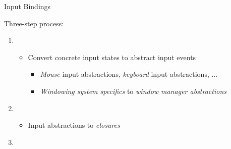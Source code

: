 \begin{frame}[t]{Input Bindings}

    Three-step process:

    \begin{enumerate}
        \itemsep.3em

        \item {}
            \begin{itemize}
                \item Convert concrete input states to abstract input events
                    \begin{itemize}
                        \item \textit{Mouse} input abstractions, \textit{keyboard} input abstractions, ...
                        \item \textit{Windowing system specifics} to \textit{window manager abstractions}
                    \end{itemize}

            \end{itemize}

        \item {}
            \begin{itemize}
                \item Input abstractions to \textit{closures}
            \end{itemize}

        \item {}

    \end{enumerate}

    \vfill

\end{frame}

